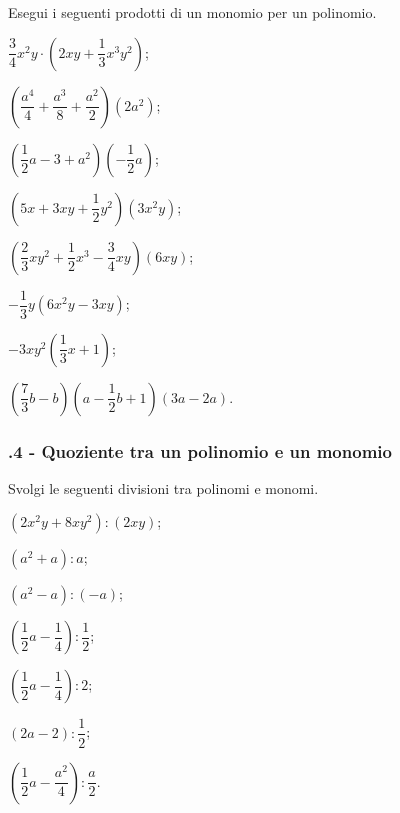 \begin{esercizio}
\label{ese:10.16}
 Esegui i seguenti prodotti di un monomio per un polinomio.
 \begin{multicols}{2}
\begin{enumeratea}
 \item $\dfrac{3}{4}x^{2}y\cdot\left(2{xy}+\dfrac{1}{3}x^{3}y^{2}\right)$;
 \item $\left(\dfrac{a^{4}}{4}+\dfrac{a^{3}}{8}+\dfrac{a^{2}}{2}\right)\left(2a^{2}\right)$;
 \item $\left(\dfrac{1}{2}a-3+a^{2}\right)\left(-{\dfrac{1}{2}}a\right)$;
 \item $\left(5x+3{xy}+\dfrac{1}{2}y^{2}\right)\left(3x^{2}y\right)$;
 \item $\left(\dfrac{2}{3}xy^{2}+\dfrac{1}{2}x^{3}-\dfrac{3}{4}{xy}\right)(6{xy})$;
 \item $-\dfrac{1}{3}y\left(6x^{2}y-3{xy}\right)$;
 \item $-3xy^2\left(\dfrac{1}{3}x+1\right)$;
 \item $\left(\dfrac{7}{3}b-b\right)\left(a-\dfrac{1}{2}b+1\right)(3a-2a)$.
\end{enumeratea}
\end{multicols}
\end{esercizio}
\subsubsection*{\thechapter.4 - Quoziente tra un polinomio e un monomio}
\begin{esercizio}
\label{ese:10.17}
 Svolgi le seguenti divisioni tra polinomi e monomi.
 \begin{multicols}{2}
\begin{enumeratea}
 \item $\left(2x^{2}y+8{xy}^{2}\right):\left(2{xy}\right)$;
 \item $\left(a^{2}+a\right):a$;
 \item $\left(a^{2}-a\right):(-a)$;
 \item $\left(\dfrac{1}{2}a-\dfrac{1}{4}\right):\dfrac{1}{2}$;
 \item $\left(\dfrac{1}{2}a-\dfrac{1}{4}\right):2$;
 \item $(2a-2):\dfrac{1}{2}$;
 \item $\left(\dfrac{1}{2}a-\dfrac{a^{2}}{4}\right):\dfrac{a}{2}$.
\end{enumeratea}
\end{multicols}
\end{esercizio}

